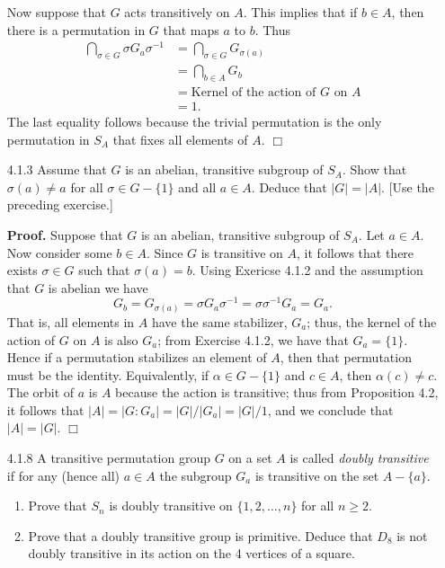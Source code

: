 \documentclass[9pt]{article}
\newcommand{\qed}{\hfill \ensuremath{\Box}}
\begin{document}
\begin{enumerate}
      Now suppose that $G$ acts transitively on $A$. This implies that if
      $b \in A$, then there is a permutation in $G$ that maps $a$ to $b$. Thus
      \begin{align*}
         \bigcap_{\sigma \in G}\sigma G_a\sigma^{-1} &=
            \bigcap_{\sigma \in G} G_{\sigma(a)} \\
            &= \bigcap_{b \in A} G_b \\
            &= \text{Kernel of the action of $G$ on $A$} \\
            &= 1.
      \end{align*}
      The last equality follows because the trivial permutation is the only
      permutation in $S_A$ that fixes all elements of $A$. \qed
   \item[4.1.3]   Assume that $G$ is an abelian, transitive subgroup of $S_A$.
                  Show that $\sigma(a) \neq a$ for all $\sigma \in G - \{1\}$
                  and all $a \in A$. Deduce that $|G| = |A|$. [Use the preceding
                  exercise.]
                  
      \textbf{Proof.} Suppose that $G$ is an abelian, transitive subgroup of
      $S_A$. Let $a \in A$. Now consider some $b \in A$. Since $G$ is transitive
      on $A$, it follows that there exists $\sigma \in G$ such that
      $\sigma(a) = b$. Using Exericse 4.1.2 and the assumption that $G$ is
      abelian we have
      $$G_b = G_{\sigma(a)} = \sigma G_a\sigma^{-1} =
        \sigma\sigma^{-1}G_a = G_a.$$
      That is, all elements in $A$ have the same stabilizer, $G_a$; thus, the
      kernel of the action of $G$ on $A$ is also $G_a$; from Exercise 4.1.2, we
      have that $G_a = \{1\}$. Hence if a permutation stabilizes an element of
      $A$, then that permutation must be the identity. Equivalently, if
      $\alpha \in G - \{1\}$ and $c \in A$, then $\alpha(c) \neq c$. The orbit
      of $a$ is $A$ because the action is transitive; thus from Proposition 4.2,
      it follows that $|A| = |G : G_a| = |G|/|G_a| = |G|/1$, and we conclude
      that $|A| = |G|$. \qed
   \item[4.1.8]   A transitive permutation group $G$ on a set $A$ is called
                  \textit{doubly transitive} if for any (hence all) $a \in A$
                  the subgroup $G_a$ is transitive on the set $A - \{a\}$.
                  \begin{enumerate}
                     \item Prove that $S_n$ is doubly transitive on
                           $\{1, 2, \ldots, n\}$ for all $n \ge 2$.
                     \item Prove that a doubly transitive group is primitive.
                           Deduce that $D_8$ is not doubly transitive in its
                           action on the 4 vertices of a square.
                  \end{enumerate}
                  

\end{enumerate}
\end{document}
